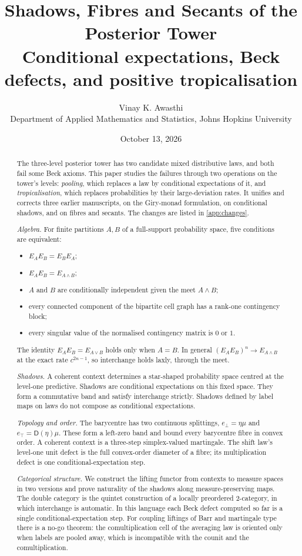 \documentclass[11pt]{article}
\title{\textbf{Shadows, Fibres and Secants of the Posterior Tower}\\[.4em]
\large Conditional expectations, Beck defects, and positive tropicalisation}
\author{Vinay K. Awasthi\\ Department of Applied Mathematics and Statistics, Johns Hopkins University}
\date{October 13, 2026}
\theoremstyle{definition}
\newcommand{\D}{\mathsf D}
\newcommand{\ebot}{e_{\perp}}
\newcommand{\etop}{e_{\top}}
\begin{document}
\maketitle

\begin{abstract}
The three-level posterior tower \cite{Tower} has two candidate mixed distributive laws, and both fail some Beck axioms. This paper
studies the failures through two operations on the tower's levels: \emph{pooling}, which replaces a law by conditional expectations of
it, and \emph{tropicalisation}, which replaces probabilities by their large-deviation rates. It unifies and corrects three earlier
manuscripts, on the Giry-monad formulation, on conditional shadows, and on fibres and secants. The changes are listed in
\cref{app:changes}.

\emph{Algebra.} For finite partitions $A,B$ of a full-support probability space, five conditions are equivalent:
\begin{itemize}
\item $E_AE_B=E_BE_A$;
\item $E_AE_B=E_{A\wedge B}$;
\item $A$ and $B$ are conditionally independent given the meet $A\wedge B$;
\item every connected component of the bipartite cell graph has a rank-one contingency block;
\item every singular value of the normalised contingency matrix is $0$ or $1$.
\end{itemize}
The identity $E_AE_B=E_{A\vee B}$ holds only when $A=B$. In general $(E_AE_B)^n\to E_{A\wedge B}$ at the exact rate $c^{2n-1}$, so
interchange holds laxly, through the meet.

\emph{Shadows.} A coherent context determines a star-shaped probability space centred at the level-one predictive. Shadows are
conditional expectations on this fixed space. They form a commutative band and satisfy interchange strictly. Shadows defined by
label maps on laws do not compose as conditional expectations.

\emph{Topology and order.} The barycentre has two continuous splittings, $\ebot=\eta\mu$ and $\etop=\D(\eta)\mu$. These form a
left-zero band and bound every barycentre fibre in convex order. A coherent context is a three-step simplex-valued martingale. The
shift law's level-one unit defect is the full convex-order diameter of a fibre; its multiplication defect is one
conditional-expectation step.

\emph{Categorical structure.} We construct the lifting functor from contexts to measure spaces in two versions and prove naturality of
the shadows along measure-preserving maps. The double category is the quintet construction of a locally preordered 2-category, in
which interchange is automatic. In this language each Beck defect computed so far is a single conditional-expectation step. For coupling liftings of Barr and martingale type there is a no-go theorem: the comultiplication cell of the averaging law is oriented
only when labels are pooled away, which is incompatible with the counit and the comultiplication.


\end{abstract}
\end{document}
